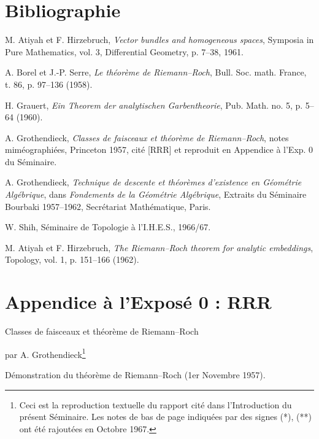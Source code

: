 \documentclass[11pt]{article}
\begin{document}
\section*{Bibliographie}
\begin{enumerate}[label={[\arabic*]},leftmargin=2.5em]
\item M. Atiyah et F. Hirzebruch, \emph{Vector bundles and homogeneous spaces}, Symposia in Pure Mathematics, vol. 3, Differential Geometry, p. 7--38, 1961.
\item A. Borel et J.-P. Serre, \emph{Le th\'eor\`eme de Riemann--Roch}, Bull. Soc. math. France, t. 86, p. 97--136 (1958).
\item H. Grauert, \emph{Ein Theorem der analytischen Garbentheorie}, Pub. Math. no. 5, p. 5--64 (1960).
\item A. Grothendieck, \emph{Classes de faisceaux et th\'eor\`eme de Riemann--Roch}, notes mim\'eographi\'ees, Princeton 1957, cit\'e [RRR] et reproduit en Appendice \`a l'Exp. 0 du S\'eminaire.
\item A. Grothendieck, \emph{Technique de descente et th\'eor\`emes d'existence en G\'eom\'etrie Alg\'ebrique}, dans \emph{Fondements de la G\'eom\'etrie Alg\'ebrique}, Extraits du S\'eminaire Bourbaki 1957--1962, Secr\'etariat Math\'ematique, Paris.
\item W. Shih, S\'eminaire de Topologie \`a l'I.H.E.S., 1966/67.
\item M. Atiyah et F. Hirzebruch, \emph{The Riemann--Roch theorem for analytic embeddings}, Topology, vol. 1, p. 151--166 (1962).
\end{enumerate}



\clearpage



\section*{Appendice à l'Exposé 0 : RRR}
\begin{center}
{\Large Classes de faisceaux et théorème de Riemann--Roch}\par
\vspace{0.5em}
par A. Grothendieck\footnote{Ceci est la reproduction textuelle du rapport cité dans l'Introduction du présent Séminaire. Les notes de bas de page indiquées par des signes (*), (**) ont été rajoutées en Octobre 1967.}
\end{center}

\begin{center}
Démonstration du théorème de Riemann--Roch (1er Novembre 1957).
\end{center}
\end{document}
